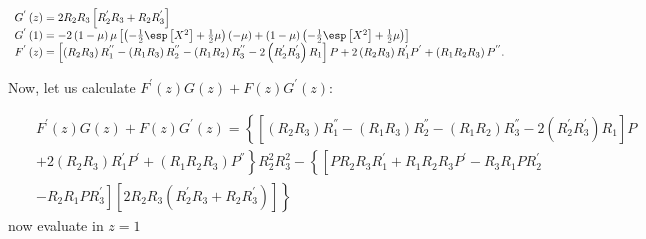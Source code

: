 \begin{eqnarray}
\begin{array}{l}
G^{'}\left(z\right)=2R_{2}R_{3}\left[R_{2}^{'}R_{3}+R_{2}R_{3}^{'}\right]\\
G^{'}\left(1\right)=-2\left(1-\mu\right)\mu\left[\left(-\frac{1}{2}\esp\left[X^{2}\right]+\frac{1}{2}\mu\right)\left(-\mu\right)+\left(1-\mu\right)\left(-\frac{1}{2}\esp\left[X^{2}\right]+\frac{1}{2}\mu\right)\right]\\
F^{'}\left(z\right)=\left[\left(R_{2}R_{3}\right)R_{1}^{''}
-\left(R_{1}R_{3}\right)R_{2}^{''}
-\left(R_{1}R_{2}\right)R_{3}^{''}
-2\left(R_{2}^{'}R_{3}^{'}\right)R_{1}\right]P
+2\left(R_{2}R_{3}\right)R_{1}^{'}P^{'}
+\left(R_{1}R_{2}R_{3}\right)P^{''}.
\end{array}
\end{eqnarray}

Now, let us calculate $F^{'}\left(z\right)G\left(z\right)+F\left(z\right)G^{'}\left(z\right)$:

\begin{eqnarray*}
&&F^{'}\left(z\right)G\left(z\right)+F\left(z\right)G^{'}\left(z\right)=
\left\{\left[\left(R_{2}R_{3}\right)R_{1}^{''}
-\left(R_{1}R_{3}\right)R_{2}^{''}
-\left(R_{1}R_{2}\right)R_{3}^{''}
-2\left(R_{2}^{'}R_{3}^{'}\right)R_{1}\right]P\right.\\
&&\left.+2\left(R_{2}R_{3}\right)R_{1}^{'}P^{'}
+\left(R_{1}R_{2}R_{3}\right)P^{''}\right\}R_{2}^{2}R_{3}^{2}
-\left\{\left[PR_{2}R_{3}R_{1}^{'}+R_{1}R_{2}R_{3}P^{'}
-R_{3}R_{1}PR_{2}^{'}\right.\right.\\
&&\left.\left.
-R_{2}R_{1}PR_{3}^{'}\right]\left[2R_{2}R_{3}\left(R_{2}^{'}R_{3}+R_{2}R_{3}^{'}\right)\right]\right\}
\end{eqnarray*}
now evaluate in $z=1$

